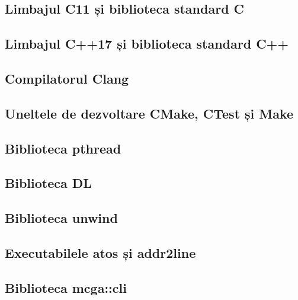 \subsection{Limbajul C11 și biblioteca standard C}
\subsection{Limbajul C++17 și biblioteca standard C++}
\subsection{Compilatorul Clang}
\subsection{Uneltele de dezvoltare CMake, CTest și Make}
\subsection{Biblioteca pthread}
\subsection{Biblioteca DL}
\subsection{Biblioteca unwind}
\subsection{Executabilele atos și addr2line}
\subsection{Biblioteca mcga::cli}

